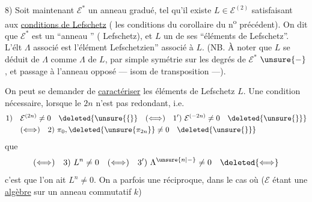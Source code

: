 8) Soit maintenant $\mathcal E^*$ un anneau gradué,  tel qu'il existe $L\in\mathcal E^{(2)}$ satisfaisant aux \uline{conditions de Lefschetz} ( les conditions du corollaire du n\textsuperscript{o} précédent). On dit que $\mathcal E^*$ est un ``anneau '' (      Lefschetz), et $L$ un de ses ``éléments de Lefschetz''.
L'élt $\Lambda$ associé est  l'élément  Lefschetzien'' associé à $L$.
(NB. À noter que $L$ se déduit de $\Lambda$ comme $\Lambda$ de $L$, par simple symétrie sur les degrés de $\mathcal E^*$  $\unsure{-}$, et passage à l'anneau opposé ---  isom de transposition ---).

On peut se demander de \uline{caractériser} les  éléments de Lefschetz $L$. Une condition nécessaire, lorsque le  $2n$ n'est pas redondant, i.e.
\[
\begin{aligned}
1)\quad&\mathcal E^{(2n)}\neq0\quad\deleted{\unsure{\{}}\quad(\Longleftrightarrow)\quad1')\ \mathcal E^{(-2n)}\neq0\quad\deleted{\unsure{\}}}\\
&(\Longleftrightarrow)\quad2)\ \pi_0,\deleted{\unsure{\pi_{2n}}}\neq0\quad\deleted{\unsure{\}}}
\end{aligned}
\]
que
\[
(\Longleftrightarrow)\quad3)\ L^n\neq0\quad(\Longleftrightarrow)\quad3')\ \Lambda^{\unsure{n|-}}\neq0\quad\deleted{\Longleftrightarrow}
\]
c'est que l'on ait $L^n\neq0$. On a parfois une réciproque, dans le cas où ($\mathcal E$ étant une \uline{algèbre} sur un anneau commutatif $k$)
